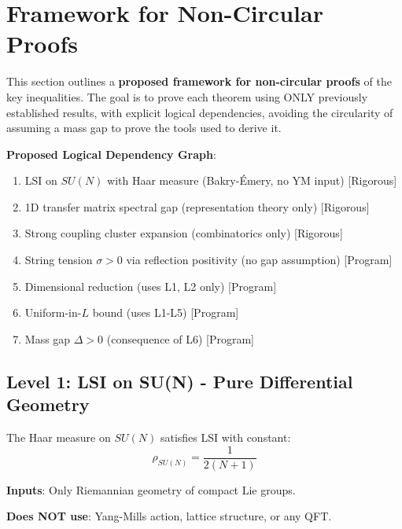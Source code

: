 \section{Framework for Non-Circular Proofs}
\label{sec:non-circular-complete}

This section outlines a \textbf{proposed framework for non-circular proofs} of the key inequalities. 
The goal is to prove each theorem using ONLY previously established results, with explicit logical dependencies, avoiding the circularity of assuming a mass gap to prove the tools used to derive it.

\textbf{Proposed Logical Dependency Graph}:
\begin{enumerate}
\item[L1.] LSI on $SU(N)$ with Haar measure (Bakry-Émery, no YM input) [Rigorous]
\item[L2.] 1D transfer matrix spectral gap (representation theory only) [Rigorous]
\item[L3.] Strong coupling cluster expansion (combinatorics only) [Rigorous]
\item[L4.] String tension $\sigma > 0$ via reflection positivity (no gap assumption) [Program]
\item[L5.] Dimensional reduction (uses L1, L2 only) [Program]
\item[L6.] Uniform-in-$L$ bound (uses L1-L5) [Program]
\item[L7.] Mass gap $\Delta > 0$ (consequence of L6) [Program]
\end{enumerate}

\subsection{Level 1: LSI on SU(N) - Pure Differential Geometry}

\begin{theorem}
\label{thm:lsi-sun-pure}
The Haar measure on $SU(N)$ satisfies LSI with constant:
\[
\rho_{SU(N)} = \frac{1}{2(N+1)}
\]

\textbf{Inputs}: Only Riemannian geometry of compact Lie groups.

\textbf{Does NOT use}: Yang-Mills action, lattice structure, or any QFT.
\end{theorem}

